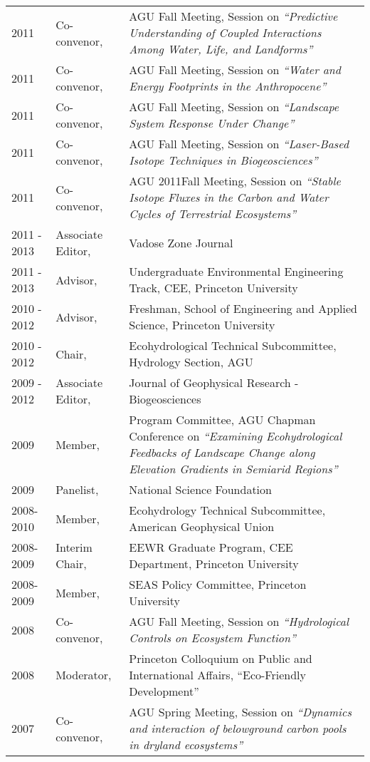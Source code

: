 \documentclass[10pt]{report}
\begin{document}
\begin{longtable}{p{.75in} p{1.1in} p{4.2in}}
2011  & Co-convenor, & AGU Fall Meeting, Session on \emph{``Predictive Understanding of Coupled Interactions Among Water, Life, and Landforms''} \\
2011  & Co-convenor, & AGU Fall Meeting, Session on \emph{``Water and Energy Footprints in the Anthropocene''} \\
2011  & Co-convenor, & AGU Fall Meeting, Session on \emph{``Landscape System Response Under Change''} \\
2011  & Co-convenor, & AGU Fall Meeting, Session on \emph{``Laser-Based Isotope Techniques in Biogeosciences''} \\
2011  & Co-convenor, & AGU 2011Fall Meeting, Session on \emph{``Stable Isotope Fluxes in the Carbon and Water Cycles of Terrestrial Ecosystems''} \\
2011 - 2013 & Associate Editor, & Vadose Zone Journal \\
2011 - 2013 & Advisor, & Undergraduate Environmental Engineering Track, CEE, Princeton University \\ 
2010 - 2012 & Advisor, & Freshman, School of Engineering and Applied Science, Princeton University \\ 
2010 - 2012 & Chair, & Ecohydrological Technical Subcommittee, Hydrology Section, AGU \\ 
2009 - 2012 & Associate Editor, & Journal of Geophysical Research - Biogeosciences \\ 
2009 & Member, & Program Committee, AGU Chapman Conference on \emph{``Examining Ecohydrological Feedbacks of Landscape Change along Elevation Gradients in Semiarid Regions''} \\
2009 & Panelist, & National Science Foundation  \\
2008-2010         & Member, & Ecohydrology Technical Subcommittee, American Geophysical Union \\
2008-2009 & Interim Chair, & EEWR Graduate Program, CEE Department, Princeton University \\
2008-2009 & Member, & SEAS Policy Committee, Princeton University \\
2008 & Co-convenor, & AGU Fall Meeting, Session on \emph{``Hydrological Controls on Ecosystem Function'' }  \\
2008 & Moderator, & Princeton Colloquium on Public and International Affairs, ``Eco-Friendly Development''  \\
2007 & Co-convenor, & AGU Spring Meeting, Session on \emph{``Dynamics and interaction of belowground carbon pools in dryland ecosystems''} \\

\end{longtable}
\end{document}
